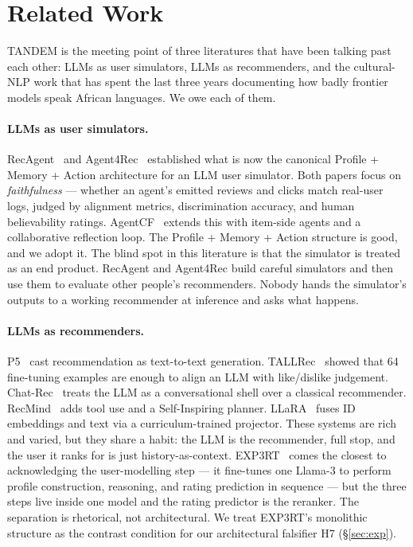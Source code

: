 \documentclass[8pt,twocolumn,a4paper]{extarticle}
\begin{document}
\section{Related Work}
\label{sec:related}

TANDEM is the meeting point of three literatures that have been talking past each other: LLMs as user simulators, LLMs as recommenders, and the cultural-NLP work that has spent the last three years documenting how badly frontier models speak African languages. We owe each of them.

\paragraph{LLMs as user simulators.}
RecAgent~\citep{wang2023recagent} and Agent4Rec~\citep{zhang2024agent4rec} established what is now the canonical Profile + Memory + Action architecture for an LLM user simulator. Both papers focus on \emph{faithfulness} --- whether an agent's emitted reviews and clicks match real-user logs, judged by alignment metrics, discrimination accuracy, and human believability ratings. AgentCF~\citep{zhang2024agentcf} extends this with item-side agents and a collaborative reflection loop. The Profile + Memory + Action structure is good, and we adopt it. The blind spot in this literature is that the simulator is treated as an end product. RecAgent and Agent4Rec build careful simulators and then use them to evaluate other people's recommenders. Nobody hands the simulator's outputs to a working recommender at inference and asks what happens.

\paragraph{LLMs as recommenders.}
P5~\citep{geng2022p5} cast recommendation as text-to-text generation. TALLRec~\citep{bao2023tallrec} showed that 64 fine-tuning examples are enough to align an LLM with like/dislike judgement. Chat-Rec~\citep{gao2023chatrec} treats the LLM as a conversational shell over a classical recommender. RecMind~\citep{wang2024recmind} adds tool use and a Self-Inspiring planner. LLaRA~\citep{liao2024llara} fuses ID embeddings and text via a curriculum-trained projector. These systems are rich and varied, but they share a habit: the LLM is the recommender, full stop, and the user it ranks for is just history-as-context. EXP3RT~\citep{kim2025exp3rt} comes the closest to acknowledging the user-modelling step --- it fine-tunes one Llama-3 to perform profile construction, reasoning, and rating prediction in sequence --- but the three steps live inside one model and the rating predictor is the reranker. The separation is rhetorical, not architectural. We treat EXP3RT's monolithic structure as the contrast condition for our architectural falsifier H7 (\S\ref{sec:exp}).
\end{document}
